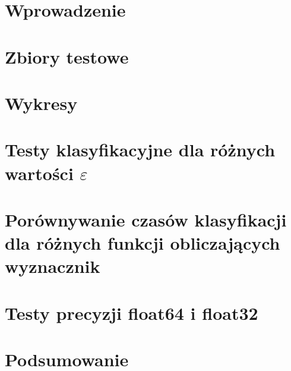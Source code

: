 \documentclass{sprawozdanie-agh}
\begin{document}

\stronatytulowa{}

\section{Wprowadzenie}

\section{Zbiory testowe}

\section{Wykresy}




\section{Testy klasyfikacyjne dla różnych wartości $\varepsilon$}


\section{Porównywanie czasów klasyfikacji dla różnych funkcji obliczających wyznacznik}

\section{Testy precyzji float64 i float32}

\section{Podsumowanie}

\end{document}
